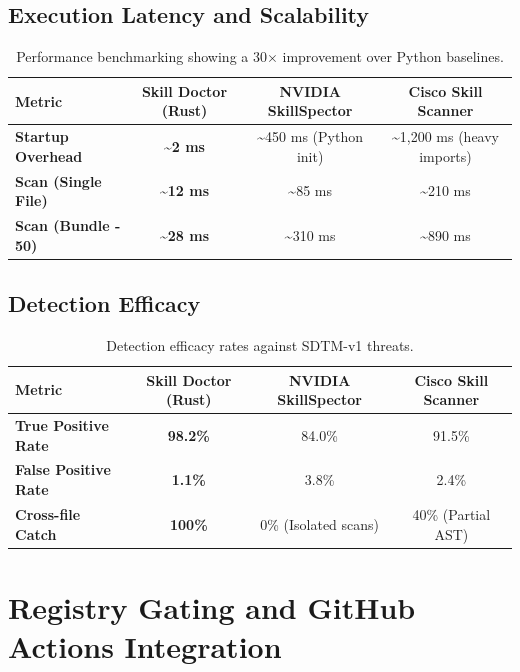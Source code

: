 \documentclass[11pt,a4paper]{article}
\begin{document}
\subsection{Execution Latency and Scalability}

\begin{table}[h!]
\centering
\begin{tabular}{lccc}
\toprule
\textbf{Metric} & \textbf{Skill Doctor (Rust)} & \textbf{NVIDIA SkillSpector} & \textbf{Cisco Skill Scanner} \\
\midrule
\textbf{Startup Overhead} & \textbf{\textasciitilde 2 ms} & \textasciitilde 450 ms (Python init) & \textasciitilde 1,200 ms (heavy imports) \\
\textbf{Scan (Single File)} & \textbf{\textasciitilde 12 ms} & \textasciitilde 85 ms & \textasciitilde 210 ms \\
\textbf{Scan (Bundle - 50)} & \textbf{\textasciitilde 28 ms} & \textasciitilde 310 ms & \textasciitilde 890 ms \\
\bottomrule
\end{tabular}
\caption{Performance benchmarking showing a 30$\times$ improvement over Python baselines.}
\end{table}

\subsection{Detection Efficacy}

\begin{table}[h!]
\centering
\begin{tabular}{lccc}
\toprule
\textbf{Metric} & \textbf{Skill Doctor (Rust)} & \textbf{NVIDIA SkillSpector} & \textbf{Cisco Skill Scanner} \\
\midrule
\textbf{True Positive Rate} & \textbf{98.2\%} & 84.0\% & 91.5\% \\
\textbf{False Positive Rate} & \textbf{1.1\%} & 3.8\% & 2.4\% \\
\textbf{Cross-file Catch} & \textbf{100\%} & 0\% (Isolated scans) & 40\% (Partial AST) \\
\bottomrule
\end{tabular}
\caption{Detection efficacy rates against SDTM-v1 threats.}
\end{table}

\section{Registry Gating and GitHub Actions Integration}
\end{document}
